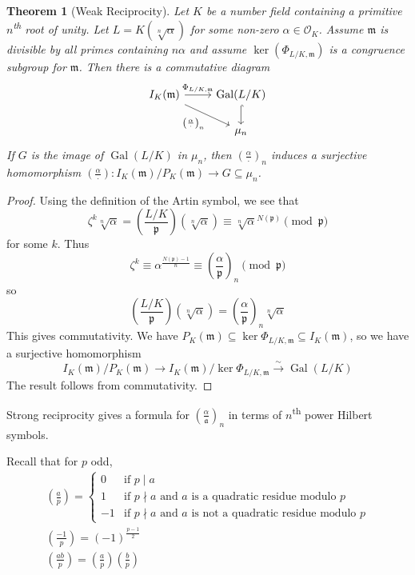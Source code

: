 \documentclass[11pt]{article}
\theoremstyle{definition}
\theoremstyle{plain}
\newtheorem{theorem}[definition]{Theorem}
\theoremstyle{remark}
\DeclareMathOperator{\Gal}{Gal}
\newcommand{\cO}{\mathcal{O}}
\newcommand{\fa}{\mathfrak{a}}
\newcommand{\fp}{\mathfrak{p}}
\newcommand{\fm}{\mathfrak{m}}
\newcommand{\leg}[2]{\left(\frac{#1}{#2}\right)}
\begin{document}
\begin{theorem}[Weak Reciprocity]\label{thm:4_11}
    Let $K$ be a number field containing a primitive $n$\textsuperscript{th} root of unity. Let $L = K(\sqrt[n]{\alpha})$ for some non-zero $\alpha \in \cO_K$. Assume $\fm$ is divisible by all primes containing $n\alpha$ and assume $\ker(\Phi_{L/K, \fm})$ is a congruence subgroup for $\fm$. Then there is a commutative diagram
    \begin{equation*}
    \begin{tikzcd}
        I_K(\fm) \arrow[r, "\Phi_{L/K, \fm}"] \arrow[rd, "\leg{\alpha}{\cdot}_n"'] & \Gal(L/K) \arrow[d, hookrightarrow]\\
                           & \mu_n
    \end{tikzcd}
    \end{equation*}
    If $G$ is the image of $\Gal(L/K)$ in $\mu_n$, then $\leg{\alpha}{\cdot}_n$ induces a surjective homomorphism $\leg{\alpha}{\cdot} : I_K(\fm)/P_K(\fm) \to G \subseteq \mu_n$.
\end{theorem}
\begin{proof}
    Using the definition of the Artin symbol, we see that
    \begin{equation*}
        \zeta^k \sqrt[n]{\alpha} = \leg{L/K}{\fp}(\sqrt[n]{\alpha}) \equiv \sqrt[n]{\alpha}^{N(\fp)} \pmod{\fp}
    \end{equation*}
    for some $k$. Thus
    \begin{equation*}
        \zeta^k \equiv \alpha^\frac{N(\fp)-1}{n} \equiv \leg{\alpha}{\fp}_n \pmod{\fp}
    \end{equation*}
    so
    \begin{equation*}
        \leg{L/K}{\fp}(\sqrt[n]{\alpha}) = \leg{\alpha}{\fp}_n \sqrt[n]{\alpha}
    \end{equation*}
    This gives commutativity. We have $P_K(\fm) \subseteq \ker \Phi_{L/K, \fm} \subseteq I_K(\fm)$, so we have a surjective homomorphism
    \begin{equation*}
        I_K(\fm) / P_K(\fm) \to I_K(\fm) / \ker \Phi_{L/K, \fm} \xrightarrow{\sim} \Gal(L/K)
    \end{equation*}
    The result follows from commutativity.
\end{proof}

\noindent Strong reciprocity gives a formula for $\leg{\alpha}{\fa}_n$ in terms of $n$\textsuperscript{th} power Hilbert symbols.

\noindent Recall that for $p$ odd,
\begin{gather*}
    \leg{a}{p} =
    \begin{cases}
        0 & \text{if } p \mid a\\
        1 & \text{if } p \nmid a \text{ and } a \text{ is a quadratic residue modulo } p\\
        -1 & \text{if } p \nmid a \text{ and } a \text{ is not a quadratic residue modulo } p
    \end{cases}\\
    \leg{-1}{p} = (-1)^{\frac{p-1}{2}}\\
    \leg{ab}{p} = \leg{a}{p} \leg{b}{p}
\end{gather*}
\end{document}
